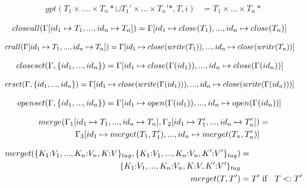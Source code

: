 \begin{align*}
gpt(T_{1} \times .... \times T_{n}{*} \sqcup T_{1}' \times ... \times T_{n}'{*}, T, i) & = T_{1} \times ... \times T_{n}{*}
\end{align*}

\begin{align*}
closeall(\Gamma[id_{1} \mapsto T_{1}, ..., id_{n} \mapsto T_{n}]) & = \Gamma[id_{1} \mapsto close(T_{1}), ..., id_{n} \mapsto close(T_{n})]
\end{align*}

\begin{align*}
crall(\Gamma[id_{1} \mapsto T_{1}, ..., id_{n} \mapsto T_{n}]) & = \Gamma[id_{1} \mapsto close(write(T_{1})), ..., id_{n} \mapsto close(write(T_{n}))]
\end{align*}

\begin{align*}
closeset(\Gamma, \{id_{1}, ..., id_{n}\}) & = \Gamma[id_{1} \mapsto close(\Gamma(id_{1})), ..., id_{n} \mapsto close(\Gamma(id_{n}))]
\end{align*}

\begin{align*}
crset(\Gamma, \{id_{1}, ..., id_{n}\}) & = \Gamma[id_{1} \mapsto close(write(\Gamma(id_{1}))), ..., id_{n} \mapsto close(write(\Gamma(id_{n})))]
\end{align*}

\begin{align*}
openset(\Gamma, \{id_{1}, ..., id_{n}\}) & = \Gamma[id_{1} \mapsto open(\Gamma(id_{1})), ..., id_{n} \mapsto open(\Gamma(id_{n}))]
\end{align*}

\begin{align*}
merge(\Gamma_{1}[id_{1} \mapsto T_{1}, ..., id_{n} \mapsto T_{n}], \Gamma_{2}[id_{1} \mapsto T_{1}', ..., id_{n} \mapsto T_{n}']) & =\\
\Gamma_{3}[id_{1} \mapsto merget(T_{1}, T_{1}'), ..., id_{n} \mapsto merget(T_{n}, T_{n}')]
\end{align*}

\begin{align*}
merget(\{K_{1}{:}V_{1}, ..., K_{n}{:}V_{n}, K{:}V\}_{tag},\{K_{1}{:}V_{1}, ..., K_{n}{:}V_{n}, K'{:}V'\}_{tag}) & = \\
\{K_{1}{:}V_{1}, ..., K_{n}{:}V_{n}, K{:}V, K'{:}V'\}_{tag}\\
merget(T,T') & = T' \; \text{if \; $T <: T'$}
\end{align*}

